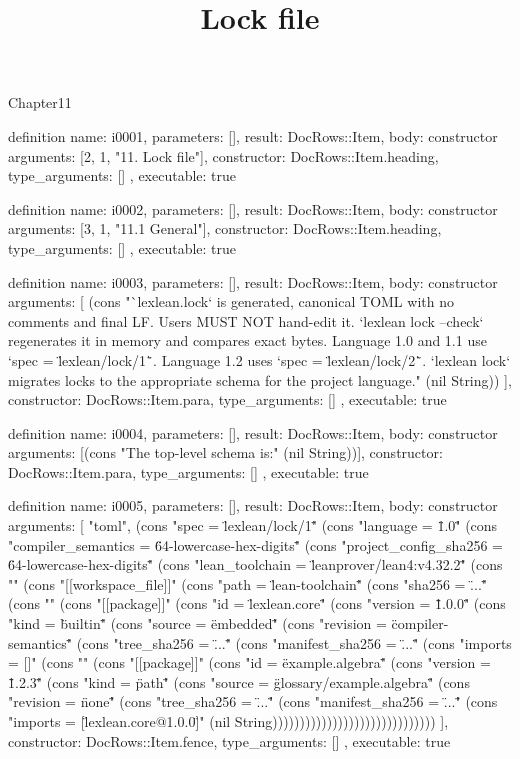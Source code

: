 \begin{lexlean}{Chapter11}
\title{Lock file}
\begin{semanticmodule}
definition{
  name: i0001,
  parameters: [],
  result: DocRows::Item,
  body: constructor{
    arguments: [2, 1, "11. Lock file"],
    constructor: DocRows::Item.heading,
    type_arguments: []
  },
  executable: true
}

definition{
  name: i0002,
  parameters: [],
  result: DocRows::Item,
  body: constructor{
    arguments: [3, 1, "11.1 General"],
    constructor: DocRows::Item.heading,
    type_arguments: []
  },
  executable: true
}

definition{
  name: i0003,
  parameters: [],
  result: DocRows::Item,
  body: constructor{
    arguments: [
      (cons "`lexlean.lock` is generated, canonical TOML with no comments and final LF. Users MUST NOT hand-edit it. `lexlean lock --check` regenerates it in memory and compares exact bytes. Language 1.0 and 1.1 use `spec = \"lexlean/lock/1\"`. Language 1.2 uses `spec = \"lexlean/lock/2\"`. `lexlean lock` migrates locks to the appropriate schema for the project language." (nil String))
    ],
    constructor: DocRows::Item.para,
    type_arguments: []
  },
  executable: true
}

definition{
  name: i0004,
  parameters: [],
  result: DocRows::Item,
  body: constructor{
    arguments: [(cons "The top-level schema is:" (nil String))],
    constructor: DocRows::Item.para,
    type_arguments: []
  },
  executable: true
}

definition{
  name: i0005,
  parameters: [],
  result: DocRows::Item,
  body: constructor{
    arguments: [
      "toml",
      (cons "spec = \"lexlean/lock/1\"" (cons "language = \"1.0\"" (cons "compiler_semantics = \"64-lowercase-hex-digits\"" (cons "project_config_sha256 = \"64-lowercase-hex-digits\"" (cons "lean_toolchain = \"leanprover/lean4:v4.32.2\"" (cons "" (cons "[[workspace_file]]" (cons "path = \"lean-toolchain\"" (cons "sha256 = \"...\"" (cons "" (cons "[[package]]" (cons "id = \"lexlean.core\"" (cons "version = \"1.0.0\"" (cons "kind = \"builtin\"" (cons "source = \"embedded\"" (cons "revision = \"compiler-semantics\"" (cons "tree_sha256 = \"...\"" (cons "manifest_sha256 = \"...\"" (cons "imports = []" (cons "" (cons "[[package]]" (cons "id = \"example.algebra\"" (cons "version = \"1.2.3\"" (cons "kind = \"path\"" (cons "source = \"glossary/example.algebra\"" (cons "revision = \"none\"" (cons "tree_sha256 = \"...\"" (cons "manifest_sha256 = \"...\"" (cons "imports = [\"lexlean.core@1.0.0\"]" (nil String))))))))))))))))))))))))))))))
    ],
    constructor: DocRows::Item.fence,
    type_arguments: []
  },
  executable: true
}


\end{semanticmodule}
\end{lexlean}
